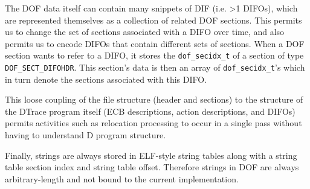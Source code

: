 The DOF data itself can contain many snippets of DIF (i.e. >1 DIFOs),
which are represented themselves as a collection of related DOF
sections.  This permits us to change the set of sections associated
with a DIFO over time, and also permits us to encode DIFOs that
contain different sets of sections.  When a DOF section wants to refer
to a DIFO, it stores the \verb|dof_secidx_t| of a section of type
\verb|DOF_SECT_DIFOHDR|.  This section's data is then an array of
\verb|dof_secidx_t|'s which in turn denote the sections associated
with this DIFO.

This loose coupling of the file structure (header and sections) to the
structure of the DTrace program itself (ECB descriptions, action
descriptions, and DIFOs) permits activities such as relocation
processing to occur in a single pass without having to understand D
program structure.

Finally, strings are always stored in ELF-style string tables along
with a string table section index and string table offset.  Therefore
strings in DOF are always arbitrary-length and not bound to the
current implementation.


